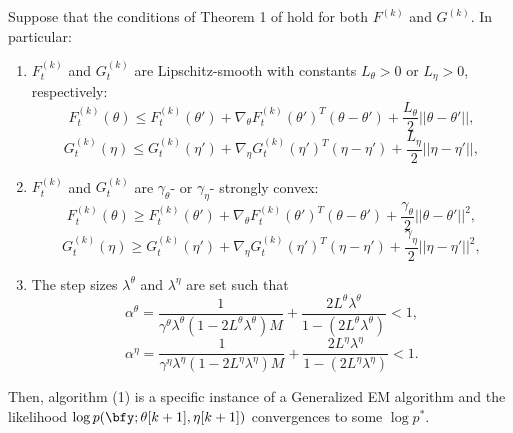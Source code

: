 \begin{lemma}
    Suppose that the conditions of Theorem 1 of \citet{Johnson:2013} hold for both $F^{(k)}$ and $G^{(k)}$. In particular:
    \begin{enumerate}
        \item $F_t^{(k)}$ and $G_t^{(k)}$ are Lipschitz-smooth with constants $L_\theta > 0$ or $L_\eta > 0$, respectively: $$F_t^{(k)}(\theta) \leq F_t^{(k)}(\theta') + \nabla_\theta F_t^{(k)}(\theta')^T(\theta-\theta') + \frac{L_\theta}{2} ||\theta - \theta'||,$$ $$G_t^{(k)}(\eta) \leq G_t^{(k)}(\eta') + \nabla_\eta G_t^{(k)}(\eta')^T(\eta-\eta') + \frac{L_\eta}{2} ||\eta - \eta'||,$$
        \item $F_t^{(k)}$ and $G_t^{(k)}$ are $\gamma_\theta$- or $\gamma_\eta$- strongly convex:
        $$F_t^{(k)}(\theta) \geq F_t^{(k)}(\theta') + \nabla_\theta F_t^{(k)}(\theta')^T(\theta-\theta') + \frac{\gamma_\theta}{2} ||\theta - \theta'||^2,$$ $$G_t^{(k)}(\eta) \geq G_t^{(k)}(\eta') + \nabla_\eta G_t^{(k)}(\eta')^T(\eta-\eta') + \frac{\gamma_\eta}{2} ||\eta - \eta'||^2,$$
        \item The step sizes $\lambda^{\theta}$ and $\lambda^{\eta}$ are set such that $$\alpha^{\theta} = \frac{1}{\gamma^{\theta} \lambda^{\theta}(1-2L^{\theta}\lambda^{\theta})M} + \frac{2L^{\theta}\lambda^{\theta}}{1-(2L^{\theta}\lambda^{\theta})} < 1,$$
        $$\alpha^{\eta} = \frac{1}{\gamma^{\eta} \lambda^{\eta}(1-2L^{\eta}\lambda^{\eta})M} + \frac{2L^{\eta}\lambda^{\eta}}{1-(2L^{\eta}\lambda^{\eta})} < 1.$$
    \end{enumerate}
    Then, algorithm (1) is a specific instance of a Generalized EM algorithm and the likelihood $\log p(\bfy ; \theta[k+1],\eta[k+1])$ convergences to some $\log p^*$.
\end{lemma}
%
